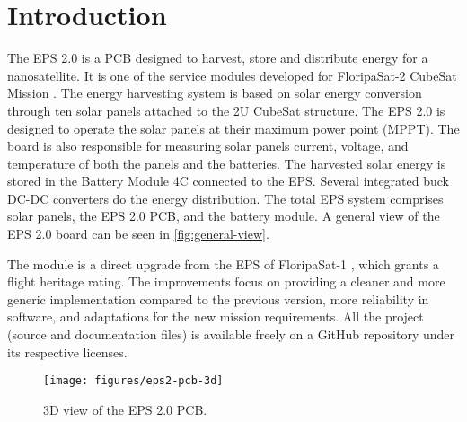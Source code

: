 %
%
%
%
%

%
%
%
%
%
%

\chapter{Introduction} \label{ch:introduction}

The EPS 2.0 is a PCB designed to harvest, store and distribute energy for a nanosatellite. It is one of the service modules developed for FloripaSat-2 CubeSat Mission \cite{floripasat2-doc}. The energy harvesting system is based on solar energy conversion through ten solar panels attached to the 2U CubeSat structure. The EPS 2.0 is designed to operate the solar panels at their maximum power point (MPPT). The board is also responsible for measuring solar panels current, voltage, and temperature of both the panels and the batteries. The harvested solar energy is stored in the Battery Module 4C \cite{bat4c} connected to the EPS. Several integrated buck DC-DC converters do the energy distribution. The total EPS system comprises solar panels, the EPS 2.0 PCB, and the battery module. A general view of the EPS 2.0 board can be seen in \autoref{fig:general-view}.

The module is a direct upgrade from the EPS of FloripaSat-1 \cite{eps-fsat}, which grants a flight heritage rating. The improvements focus on providing a cleaner and more generic implementation compared to the previous version, more reliability in software, and adaptations for the new mission requirements. All the project (source and documentation files) is available freely on a GitHub repository \cite{eps2} under its respective licenses.

\begin{figure}[!ht]
    \begin{center}
        \texttt{[image: figures/eps2-pcb-3d]}
        \caption{3D view of the EPS 2.0 PCB.}
        \label{fig:general-view}
    \end{center}
\end{figure}
